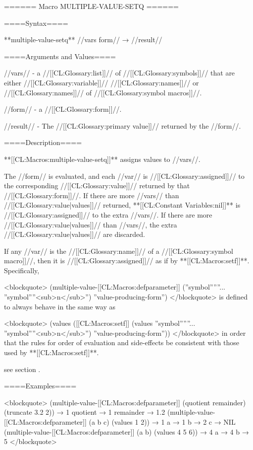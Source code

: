 ====== Macro MULTIPLE-VALUE-SETQ ======

====Syntax====

**multiple-value-setq** //vars form// → //result//

====Arguments and Values====

//vars// - a //[[CL:Glossary:list]]// of //[[CL:Glossary:symbols]]// that are either //[[CL:Glossary:variable]]// //[[CL:Glossary:names]]// or //[[CL:Glossary:names]]// of //[[CL:Glossary:symbol macros]]//.

//form// - a //[[CL:Glossary:form]]//.

//result// - The //[[CL:Glossary:primary value]]// returned by the //form//.

====Description====

**[[CL:Macros:multiple-value-setq]]** assigns values to //vars//.

The //form// is evaluated, and each //var// is //[[CL:Glossary:assigned]]// to the corresponding //[[CL:Glossary:value]]// returned by that //[[CL:Glossary:form]]//. If there are more //vars// than //[[CL:Glossary:value|values]]// returned, **[[CL:Constant Variables:nil]]** is //[[CL:Glossary:assigned]]// to the extra //vars//. If there are more //[[CL:Glossary:value|values]]// than //vars//, the extra //[[CL:Glossary:value|values]]// are discarded.

If any //var// is the //[[CL:Glossary:name]]// of a //[[CL:Glossary:symbol macro]]//, then it is //[[CL:Glossary:assigned]]// as if by **[[CL:Macros:setf]]**. Specifically,

\begingroup {} \def\subN{''<sub>n</sub>''} <blockquote> (multiple-value-[[CL:Macros:defparameter]] (''symbol''\subOne ... ''symbol''\subN) ''value-producing-form'') </blockquote> is defined to always behave in the same way as

<blockquote> (values ([[CL:Macros:setf]] (values ''symbol''\subOne ... ''symbol''\subN) ''value-producing-form'')) </blockquote> \endgroup in order that the rules for order of evaluation and side-effects be consistent with those used by **[[CL:Macros:setf]]**.

see section {\secref\SETFofVALUES}.

====Examples====

<blockquote> (multiple-value-[[CL:Macros:defparameter]] (quotient remainder) (truncate 3.2 2)) → 1 quotient → 1 remainder → 1.2 (multiple-value-[[CL:Macros:defparameter]] (a b c) (values 1 2)) → 1 a → 1 b → 2 c → NIL (multiple-value-[[CL:Macros:defparameter]] (a b) (values 4 5 6)) → 4 a → 4 b → 5 </blockquote>

